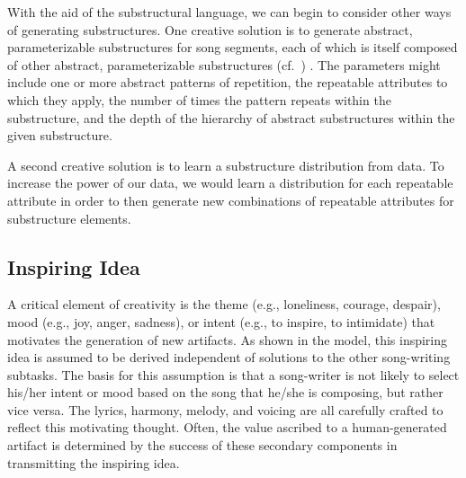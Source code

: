 \documentclass[11pt,phd]{byuprop}
\begin{document}
With the aid of the substructural language, we can begin to consider other ways of generating substructures. One creative solution is to generate abstract, parameterizable substructures for song segments, each of which is itself composed of other abstract, parameterizable substructures (cf.~\cite{lebaron2015intelligent}) . The parameters might include one or more abstract patterns of repetition, the repeatable attributes to which they apply, the number of times the pattern repeats within the substructure, and the depth of the hierarchy of abstract substructures within the given substructure.

A second creative solution is to learn a substructure distribution from data. To increase the power of our data, we would learn a distribution for each repeatable attribute in order to then generate new combinations of repeatable attributes for substructure elements.

%

\subsection{Inspiring Idea}

A critical element of creativity is the theme (e.g., loneliness, courage, despair), mood (e.g.,  joy, anger, sadness), or intent (e.g., to inspire, to intimidate) that motivates the generation of new artifacts. As shown in the model, this inspiring idea is assumed to be derived independent of solutions to the other song-writing subtasks. The basis for this assumption is that a song-writer is not likely to select his/her intent or mood based on the song that he/she is composing, but rather vice versa. The lyrics, harmony, melody, and voicing are all carefully crafted to reflect this motivating thought. Often, the value ascribed to a human-generated artifact is determined by the success of these secondary components in transmitting the inspiring idea.
\end{document}

